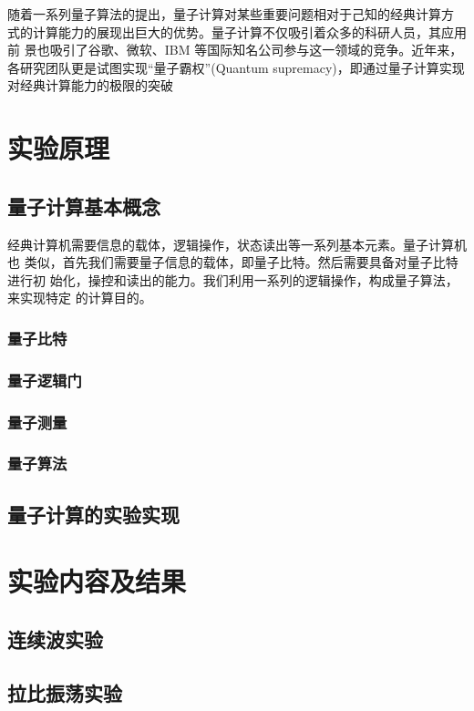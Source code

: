 \documentclass[a4paper]{article}
\begin{document}
随着一系列量子算法的提出，量子计算对某些重要问题相对于己知的经典计算方
式的计算能力的展现出巨大的优势。量子计算不仅吸引着众多的科研人员，其应用前
景也吸引了谷歌、微软、IBM 等国际知名公司参与这一领域的竞争。近年来，各研究团队更是试图实现“量子霸权”(Quantum supremacy)，即通过量子计算实现对经典计算能力的极限的突破

\section{实验原理}
\subsection{量子计算基本概念}
经典计算机需要信息的载体，逻辑操作，状态读出等一系列基本元素。量子计算机也
类似，首先我们需要量子信息的载体，即量子比特。然后需要具备对量子比特进行初
始化，操控和读出的能力。我们利用一系列的逻辑操作，构成量子算法，来实现特定
的计算目的。
\subsubsection{量子比特}

\subsubsection{量子逻辑门}
\subsubsection{量子测量}
\subsubsection{量子算法}


\subsection{量子计算的实验实现}



\section{实验内容及结果}
\subsection{连续波实验}
\subsection{拉比振荡实验}
\end{document}
